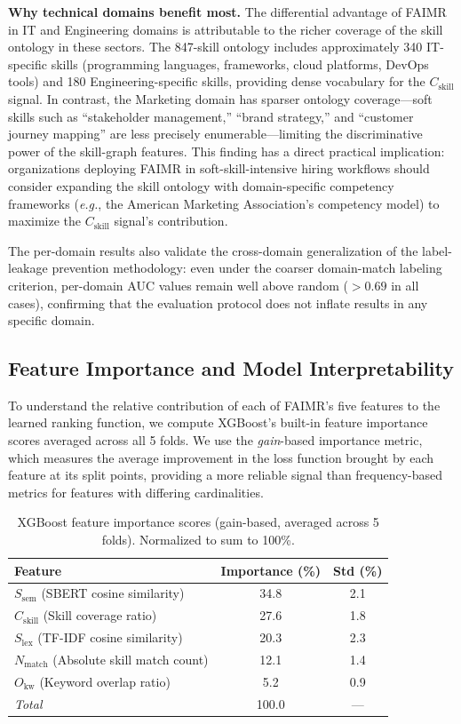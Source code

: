 \documentclass[smallcondensed,numbers]{sn-jnl}
\begin{document}
\textbf{Why technical domains benefit most.} The differential advantage of FAIMR in IT and Engineering domains is attributable to the richer coverage of the skill ontology in these sectors. The 847-skill ontology includes approximately 340 IT-specific skills (programming languages, frameworks, cloud platforms, DevOps tools) and 180 Engineering-specific skills, providing dense vocabulary for the $C_\text{skill}$ signal. In contrast, the Marketing domain has sparser ontology coverage---soft skills such as ``stakeholder management,'' ``brand strategy,'' and ``customer journey mapping'' are less precisely enumerable---limiting the discriminative power of the skill-graph features. This finding has a direct practical implication: organizations deploying FAIMR in soft-skill-intensive hiring workflows should consider expanding the skill ontology with domain-specific competency frameworks (\textit{e.g.}, the American Marketing Association's competency model) to maximize the $C_\text{skill}$ signal's contribution.

The per-domain results also validate the cross-domain generalization of the label-leakage prevention methodology: even under the coarser domain-match labeling criterion, per-domain AUC values remain well above random ($> 0.69$ in all cases), confirming that the evaluation protocol does not inflate results in any specific domain.

\subsection{Feature Importance and Model Interpretability}
\label{sec:importance}

To understand the relative contribution of each of FAIMR's five features to the learned ranking function, we compute XGBoost's built-in feature importance scores averaged across all 5 folds. We use the \textit{gain}-based importance metric, which measures the average improvement in the loss function brought by each feature at its split points, providing a more reliable signal than frequency-based metrics for features with differing cardinalities.

\begin{table}[t]
\centering
\caption{XGBoost feature importance scores (gain-based, averaged across 5 folds). Normalized to sum to 100\%.}
\label{tab:importance}
\begin{tabular}{lcc}
\toprule
Feature & Importance (\%) & Std (\%) \\
\midrule
$S_\text{sem}$ (SBERT cosine similarity) & 34.8 & 2.1 \\
$C_\text{skill}$ (Skill coverage ratio) & 27.6 & 1.8 \\
$S_\text{lex}$ (TF-IDF cosine similarity) & 20.3 & 2.3 \\
$N_\text{match}$ (Absolute skill match count) & 12.1 & 1.4 \\
$O_\text{kw}$ (Keyword overlap ratio) & 5.2 & 0.9 \\
\midrule
\textit{Total} & 100.0 & --- \\
\bottomrule
\end{tabular}
\end{table}
\end{document}
